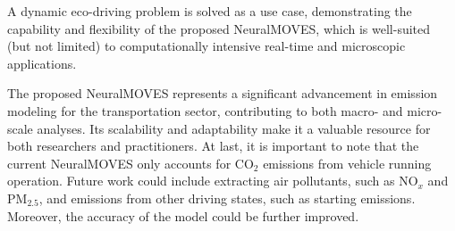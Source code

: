 \documentclass[12pt,english]{article}
\begin{document}
A dynamic eco-driving problem is solved as a use case, demonstrating the capability and flexibility of the proposed NeuralMOVES, which is well-suited (but not limited) to computationally intensive real-time and microscopic applications.


The proposed NeuralMOVES represents a significant advancement in emission modeling for the transportation sector, contributing to both macro- and micro-scale analyses.
Its scalability and adaptability make it a valuable resource for both researchers and practitioners.
At last, it is important to note that the current NeuralMOVES only accounts for CO$_2$ emissions from vehicle running operation. Future work could include extracting air pollutants, such as NO$_x$ and PM$_{2.5}$, and emissions from other driving states, such as starting emissions. Moreover, the accuracy of the model could be further improved.




 

\end{document}
